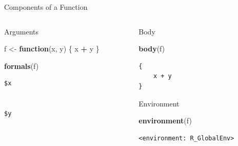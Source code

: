 \documentclass[
  ignorenonframetext,
  aspectratio=1610,
  onlytextwidth]{beamer}
\newenvironment{Shaded}{\begin{snugshade}}{\end{snugshade}}
\newcommand{\ControlFlowTok}[1]{\textcolor[rgb]{0.13,0.29,0.53}{\textbf{#1}}}
\newcommand{\FunctionTok}[1]{\textcolor[rgb]{0.13,0.29,0.53}{\textbf{#1}}}
\newcommand{\NormalTok}[1]{#1}
\newcommand{\OtherTok}[1]{\textcolor[rgb]{0.56,0.35,0.01}{#1}}
\newcommand{\SpecialCharTok}[1]{\textcolor[rgb]{0.81,0.36,0.00}{\textbf{#1}}}
\begin{document}
\begin{frame}[fragile]{Components of a Function}
\label{components-of-a-function}
\begin{columns}[T]
\begin{column}{0.47\linewidth}
\begin{block}{Arguments}
\label{arguments}
\begin{Shaded}
\begin{Highlighting}[]
\NormalTok{f }\OtherTok{\textless{}{-}} \ControlFlowTok{function}\NormalTok{(x, y) \{}
\NormalTok{  x }\SpecialCharTok{+}\NormalTok{ y}
\NormalTok{\}}
\end{Highlighting}
\end{Shaded}

\pause

\begin{Shaded}
\begin{Highlighting}[]
\FunctionTok{formals}\NormalTok{(f)}
\end{Highlighting}
\end{Shaded}

\begin{verbatim}
$x


$y
\end{verbatim}
\end{block}
\end{column}

\pause

\begin{column}{0.47\linewidth}
\begin{block}{Body}
\label{body}
\begin{Shaded}
\begin{Highlighting}[]
\FunctionTok{body}\NormalTok{(f)}
\end{Highlighting}
\end{Shaded}

\begin{verbatim}
{
    x + y
}
\end{verbatim}

\pause
\end{block}

\begin{block}{Environment}
\label{environment}
\begin{Shaded}
\begin{Highlighting}[]
\FunctionTok{environment}\NormalTok{(f)}
\end{Highlighting}
\end{Shaded}

\begin{verbatim}
<environment: R_GlobalEnv>
\end{verbatim}
\end{block}
\end{column}
\end{columns}
\end{frame}
\end{document}
